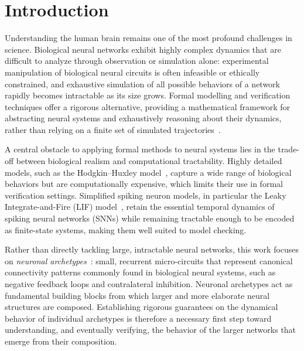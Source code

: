 \documentclass[
]{ceurart}
\begin{document}
\section{Introduction}

Understanding the human brain remains one of the most profound challenges in
science. Biological neural networks exhibit highly complex dynamics that are
difficult to analyze through observation or simulation alone: experimental
manipulation of biological neural circuits is often infeasible or ethically
constrained, and exhaustive simulation of all possible behaviors of a network
rapidly becomes intractable as its size grows. Formal modelling and verification techniques offer a rigorous alternative,
providing a mathematical framework for abstracting neural systems and
exhaustively reasoning about their dynamics, rather than relying on a finite
set of simulated trajectories~\cite{Clarke1999}.

A central obstacle to applying formal methods to neural systems lies in the
trade-off between biological realism and computational tractability. Highly
detailed models, such as the Hodgkin--Huxley model~\cite{Hodgkin1952},
capture a wide range of biological behaviors but are computationally
expensive, which limits their use in formal verification settings. Simplified
spiking neuron models, in particular the Leaky Integrate-and-Fire (LIF)
model~\cite{Lapicque1907,Gerstner2002}, retain the essential temporal
dynamics of spiking neural networks (SNNs) while remaining tractable enough
to be encoded as finite-state systems, making them well suited to model
checking.

Rather than directly tackling large, intractable neural networks, this work
focuses on \emph{neuronal archetypes}~\cite{DeMaria2020}: small, recurrent
micro-circuits that represent canonical connectivity patterns commonly found
in biological neural systems, such as negative feedback loops and
contralateral inhibition. Neuronal archetypes act as fundamental building
blocks from which larger and more elaborate neural structures are composed.
Establishing rigorous guarantees on the dynamical behavior of individual
archetypes is therefore a necessary first step toward understanding, and
eventually verifying, the behavior of the larger networks that emerge from
their composition.
\end{document}
